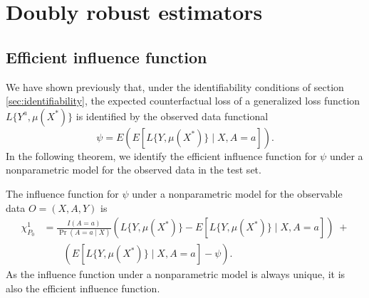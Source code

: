 

\section{Doubly robust estimators}

\subsection{Efficient influence function}
We have shown previously that, under the identifiability conditions of section \ref{sec:identifiability}, the expected counterfactual loss of a generalized loss function $L\{Y^a, \mu(X^*)\}$ is identified by the observed data functional
\begin{equation*}\label{eqn:cl_estimand}
    \psi = E\left(E[L\{Y, \mu(X^*)\} \mid X, A=a] \right).
\end{equation*}
In the following theorem, we identify the efficient influence function for $\psi$ under a nonparametric model for the observed data in the test set. 

\begin{theorem}
    The influence function for $\psi$ under a nonparametric model for the observable data $O = (X, A, Y)$ is 
\begin{align*}
    \chi_{P_0}^1 &= \frac{I(A = a)}{\Pr(A = a \mid X)}(L\{Y, \mu(X^*)\} - E[L\{Y, \mu(X^*)\} \mid X, A=a])  \; + \\
    & \qquad (E[L\{Y, \mu(X^*)\} \mid X, A=a] - \psi).
\end{align*}
As the influence function under a nonparametric model is always unique, it is also the efficient influence function. 
\end{theorem}


